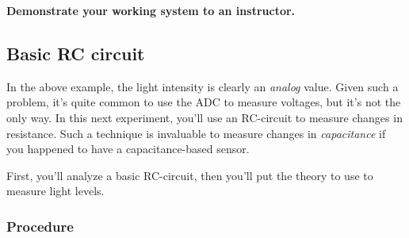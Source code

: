 \documentclass[11pt]{article} %
\begin{document}
{\bf Demonstrate your working system to an instructor.}

\subsection*{Basic RC circuit}
\label{sec:rc.circuit}

In the above example, the light intensity is clearly an \emph{analog} value. Given such a problem, it’s quite common to use the ADC to measure voltages, but it’s not the only way. In this next experiment, you’ll use an RC-circuit to measure changes in resistance. Such a technique is invaluable to measure changes in \emph{capacitance} if you happened to have a capacitance-based sensor.

First, you’ll analyze a basic RC-circuit, then you’ll put the theory to use to measure light levels.

\subsubsection*{Procedure}
\end{document}
